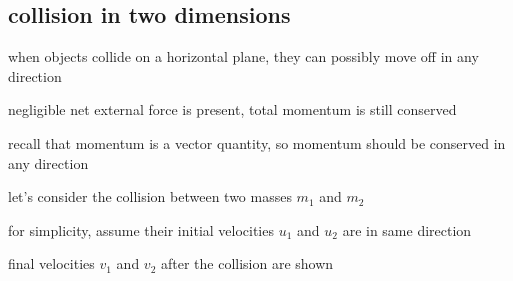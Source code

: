 \subsection{collision in two dimensions}

when objects collide on a horizontal plane, they can possibly move off in any direction

negligible net external force is present, total momentum is still conserved

recall that momentum is a vector quantity, so momentum should be conserved in any direction

\vspace*{\baselineskip}

let's consider the collision between two masses $m_1$ and $m_2$

for simplicity, assume their initial velocities $u_1$ and $u_2$ are in same direction

final velocities $v_1$ and $v_2$ after the collision are shown

